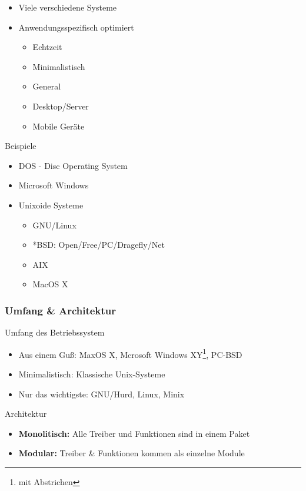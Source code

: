 \documentclass[compress]{beamer}
\begin{document}
\begin{frame}
	\begin{block}{}
		\begin{itemize}
			\item Viele verschiedene Systeme 
			\item Anwendungsspezifisch optimiert
				\begin{itemize}
					\item Echtzeit
					\item Minimalistisch
					\item General
					\item Desktop/Server
					\item Mobile Geräte 
				\end{itemize}
		\end{itemize}
	\end{block}
	\begin{block}{Beispiele}
		\begin{itemize}
			\item DOS - Disc Operating System
			\item Microsoft Windows
			\item Unixoide Systeme
				\begin{itemize}
					\item GNU/Linux
					\item *BSD: Open/Free/PC/Dragefly/Net
					\item AIX
					\item MacOS X
				\end{itemize}
		\end{itemize}
	\end{block}
\end{frame}

\begin{frame}
	\frametitle{Umfang \& Architektur}
	\begin{block}{Umfang des Betriebssystem}
		\begin{itemize}
			\item Aus einem Guß: MaxOS X, Mcrosoft Windows XY\footnote{mit Abstrichen}, PC-BSD
			\item Minimalistisch: Klassische Unix-Systeme
			\item Nur das wichtigste: GNU/Hurd, Linux, Minix
		\end{itemize}
	\end{block}
	\pause{}
	\begin{block}{Architektur}
		\begin{itemize}
			\item \textbf{Monolitisch:} Alle Treiber und Funktionen sind in einem Paket
			\item \textbf{Modular:} Treiber \& Funktionen kommen als einzelne Module
		\end{itemize}
	\end{block}
\end{frame}
\end{document}
